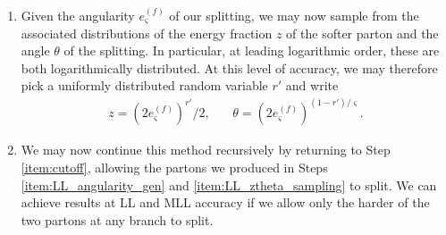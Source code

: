 \begin{enumerate}
    \item
    \label{item:LL_ztheta_sampling}
    Given the angularity \(e^{(f)}_\varsigma\) of our splitting, we may now sample from the associated distributions of the energy fraction \(z\) of the softer parton and the angle \(\theta\) of the splitting.
    In particular, at leading logarithmic order, these are both logarithmically distributed.
    At this level of accuracy, we may therefore pick a uniformly distributed random variable \(r'\) and write
    \begin{align}
        z = (2e^{(f)}_\varsigma)^{r'}/2
        ,
        ~~~~~~~~
        \theta = (2e^{(f)}_\varsigma)^{(1-r')/\varsigma}
        .
    \end{align}


    \item
    We may now continue this method recursively by returning to Step \ref{item:cutoff}, allowing the partons we produced in Steps \ref{item:LL_angularity_gen} and \ref{item:LL_ztheta_sampling} to split.
    We can achieve results at LL and MLL accuracy if we allow only the harder of the two partons at any branch to split.
\end{enumerate}



